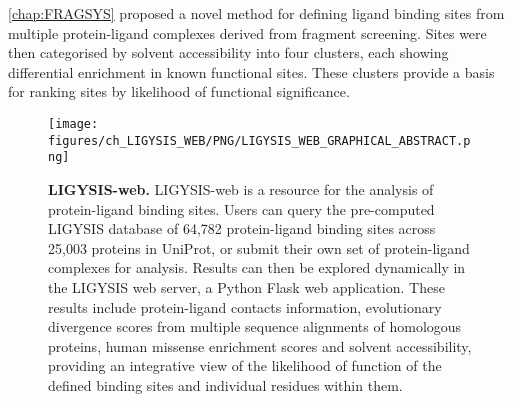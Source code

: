 
\autoref{chap:FRAGSYS} proposed a novel method for defining ligand binding sites from multiple protein-ligand complexes derived from fragment screening. Sites were then categorised by solvent accessibility into four clusters, each showing differential enrichment in known functional sites. These clusters provide a basis for ranking sites by likelihood of functional significance.

\begin{figure}[htb!]
    \centering
    \texttt{[image: figures/ch\_LIGYSIS\_WEB/PNG/LIGYSIS\_WEB\_GRAPHICAL\_ABSTRACT.png]}
    \caption[LIGYSIS-web]{\textbf{LIGYSIS-web.} LIGYSIS-web is a resource for the analysis of protein-ligand binding sites. Users can query the pre-computed LIGYSIS database of 64,782 protein-ligand binding sites across 25,003 proteins in UniProt, or submit their own set of protein-ligand complexes for analysis. Results can then be explored dynamically in the LIGYSIS web server, a Python Flask web application. These results include protein-ligand contacts information, evolutionary divergence scores from multiple sequence alignments of homologous proteins, human missense enrichment scores and solvent accessibility, providing an integrative view of the likelihood of function of the defined binding sites and individual residues within them.}
    \label{fig:LIGYSIS_WEB}
\end{figure}

